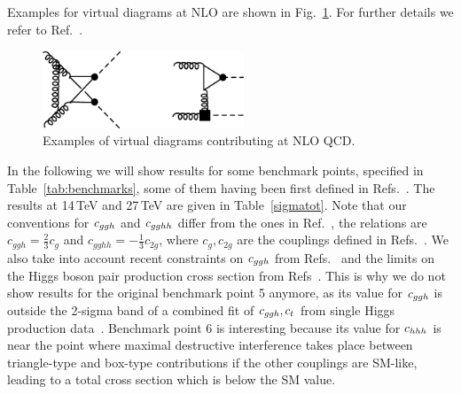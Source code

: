 Examples for virtual diagrams at NLO are shown in
Fig.~\ref{fig:virt_examples}.
For further details we refer to Ref.~\cite{Buchalla:2018yce}.
\begin{figure}[htb]
\begin{center}
\includegraphics[width=6cm]{section3/plots/hpnloyr1.pdf}
\end{center}
\caption{Examples of virtual diagrams contributing at NLO QCD.}
\label{fig:virt_examples}
\end{figure}



In the following we will show results for some benchmark points, specified in Table~\ref{tab:benchmarks}, 
some of them having been first defined in Refs.~\cite{Carvalho:2015ttv}.
The results at 14\,TeV and 27\,TeV are given in Table~\ref{sigmatot}.
Note that our conventions for $c_{ggh}$ and $c_{gghh}$ differ from the ones in
Ref.~\cite{Carvalho:2015ttv,Carvalho:2016rys}, the relations are $c_{ggh}= \frac{2}{3}c_g $
and $c_{gghh}=-\frac{1}{3}c_{2g}$, where $c_g,c_{2g}$ are the
couplings defined in Refs.~\cite{Carvalho:2015ttv,Carvalho:2016rys}.
We also take into account recent constraints on $c_{ggh}$ from
Refs.~\cite{CMS-PAS-HIG-17-031,deBlas:2018tjm}
and the  limits on the Higgs boson pair production cross section
from Refs~\cite{CMS-PAS-HIG-17-030,ATLAS-CONF-2018-043}.
This is why we do not show results for the original benchmark point 5
anymore, as its value for $c_{ggh}$ is outside the 2-sigma band of a
combined fit of $c_{ggh},c_{t}$ from single Higgs production
data~\cite{CMS-PAS-HIG-17-031,deBlas:2018tjm}.
Benchmark point 6 is interesting because its value for $c_{hhh}$ is near
the point where maximal destructive interference takes place between
triangle-type and box-type contributions if the other couplings are SM-like, leading to a total cross
section which is below the SM value.


